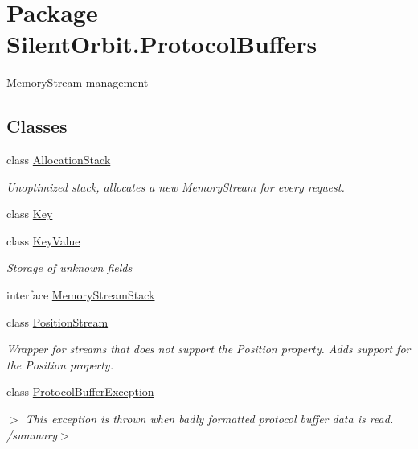 \hypertarget{namespace_silent_orbit_1_1_protocol_buffers}{}\section{Package Silent\+Orbit.\+Protocol\+Buffers}
\label{namespace_silent_orbit_1_1_protocol_buffers}


Memory\+Stream management  


\subsection*{Classes}
\begin{DoxyCompactItemize}
\item 
class \hyperlink{class_silent_orbit_1_1_protocol_buffers_1_1_allocation_stack}{Allocation\+Stack}
\begin{DoxyCompactList}\small\item\em Unoptimized stack, allocates a new Memory\+Stream for every request. \end{DoxyCompactList}\item 
class \hyperlink{class_silent_orbit_1_1_protocol_buffers_1_1_key}{Key}
\item 
class \hyperlink{class_silent_orbit_1_1_protocol_buffers_1_1_key_value}{Key\+Value}
\begin{DoxyCompactList}\small\item\em Storage of unknown fields \end{DoxyCompactList}\item 
interface \hyperlink{interface_silent_orbit_1_1_protocol_buffers_1_1_memory_stream_stack}{Memory\+Stream\+Stack}
\item 
class \hyperlink{class_silent_orbit_1_1_protocol_buffers_1_1_position_stream}{Position\+Stream}
\begin{DoxyCompactList}\small\item\em Wrapper for streams that does not support the Position property. Adds support for the Position property. \end{DoxyCompactList}\item 
class \hyperlink{class_silent_orbit_1_1_protocol_buffers_1_1_protocol_buffer_exception}{Protocol\+Buffer\+Exception}
\begin{DoxyCompactList}\small\item\em $>$ This exception is thrown when badly formatted protocol buffer data is read. /summary$>$ \end{DoxyCompactList}\item 

\end{DoxyCompactItemize}
